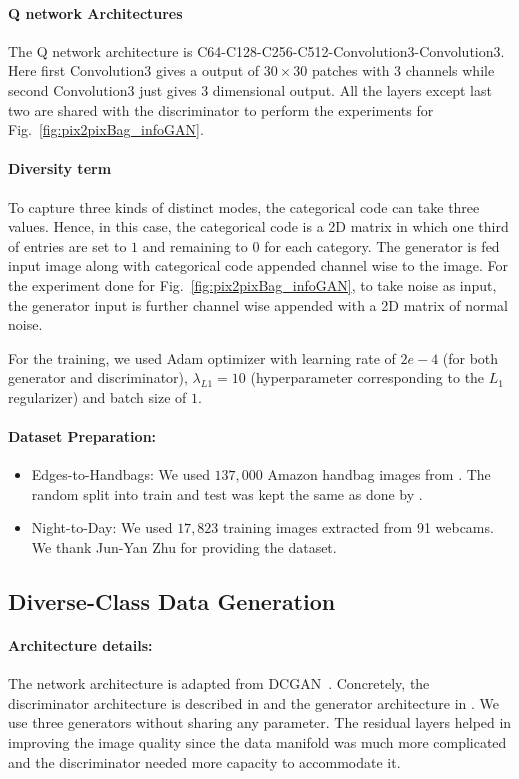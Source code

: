 \paragraph{Q network Architectures}
The Q network architecture is C64-C128-C256-C512-Convolution3-Convolution3. Here first Convolution3 gives a output of $30\times 30$ patches with $3$ channels while second Convolution3 just gives $3$ dimensional output. All the layers except last two are shared with the discriminator to perform the experiments for Fig.~\ref{fig:pix2pixBag_infoGAN}.

\paragraph{Diversity term}
To capture three kinds of distinct modes, the categorical code can take three values. Hence, in  this case, the categorical code is a 2D matrix in which one third of entries are set to $1$ and remaining to $0$ for each category. The generator is fed input image along with categorical code appended channel wise to the image. For the experiment done for Fig.~\ref{fig:pix2pixBag_infoGAN}, to take noise as input, the generator input is further channel wise appended with a 2D matrix of normal noise.

For the training, we used Adam optimizer with learning rate of $2e-4$ (for both generator and discriminator), $\lambda_{L1} = 10$ (hyperparameter corresponding to the $L_1$ regularizer) and batch size of $1$. 

\paragraph{Dataset Preparation:}
\begin{itemize}
	\item Edges-to-Handbags:  We used $137,000$ Amazon handbag images from \cite{zhu2016generative}. The random split into train and test was kept the same as done by \cite{zhu2016generative}.
	\item Night-to-Day: We used $17,823$ training images extracted from 91 webcams. We thank Jun-Yan Zhu for providing the dataset. 
\end{itemize}

\subsection{Diverse-Class Data Generation}
\paragraph{Architecture details:} The network architecture is adapted from DCGAN~\cite{radford2015unsupervised}. Concretely, the discriminator architecture is described in  and the generator architecture in . We use three generators without sharing any parameter. The residual layers helped in improving the image quality since the data manifold was much more complicated and the discriminator needed more capacity to accommodate it.

